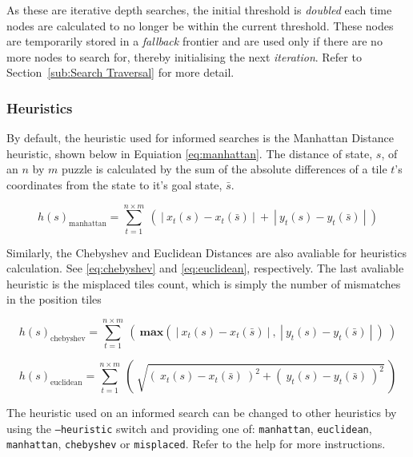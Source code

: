 As these are iterative depth searches, the initial threshold is \emph{doubled}
each time nodes are calculated to no longer be within the current threshold.
These nodes are temporarily stored in a \emph{fallback} frontier and are used
only if there are no more nodes to search for, thereby initialising the next
\emph{iteration}. Refer to Section~\ref{sub:Search Traversal} for more detail.

\subsubsection{Heuristics}
\label{subs:Heuristics}

By default, the heuristic used for informed searches is the Manhattan Distance
heuristic, shown below in Equiation \ref{eq:manhattan}. The distance of state,
$s$, of an $n$ by $m$ puzzle is calculated by the sum of the absolute
differences of a tile $t$'s coordinates from the state to it's goal state,
$\bar{s}$.

\begin{equation} \label{eq:manhattan}
  h(s)_{\text{manhattan}} =
    \sum_{t=1}^{n \times m} \ ( \
      | \ x_{t}(s) - x_{t}(\bar{s}) \ | \ + \ | \ y_{t}(s) - y_{t}(\bar{s}) \ |
    \ )
\end{equation}

Similarly, the Chebyshev and Euclidean Distances are also avaliable for
heuristics calculation. See \ref{eq:chebyshev} and \ref{eq:euclidean},
respectively. The last avaliable heuristic is the misplaced tiles count,
which is simply the number of mismatches in the position tiles

\begin{equation} \label{eq:chebyshev}
  h(s)_{\text{chebyshev}} =
    \sum_{t=1}^{n \times m} \ ( \
      \mathbf{max}( \ | \ x_{t}(s) - x_{t}(\bar{s}) \ | \ , \ | \ y_{t}(s) - y_{t}(\bar{s}) \ | \ )
    \ )
\end{equation}

\begin{equation} \label{eq:euclidean}
  h(s)_{\text{euclidean}} =
    \sum_{t=1}^{n \times m} \ ( \
      \sqrt{ ( \ x_{t}(s) - x_{t}(\bar{s}) \ )^{2} + ( \ y_{t}(s) - y_{t}(\bar{s}) \ )^{2} }
    \ )
\end{equation}

The heuristic used on an informed search can be changed to other heuristics by
using the  \texttt{--heuristic} switch and providing one of: \texttt{manhattan},
\texttt{euclidean}, \texttt{manhattan}, \texttt{chebyshev} or
\texttt{misplaced}. Refer to the help for more instructions.

